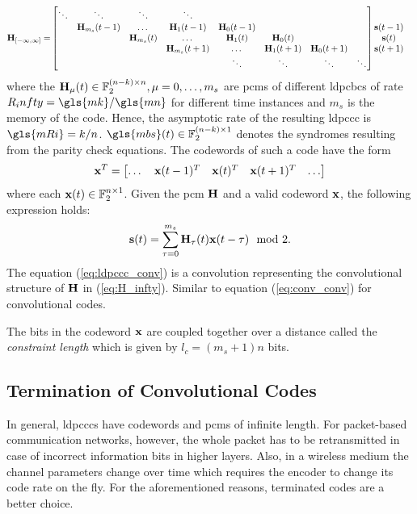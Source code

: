 \begin{align}\label{eq:H_infty}
\mathbf{H}_{[-\infty,\infty]} =& 
\begin{bmatrix}
  \ddots &\ddots &\ddots &\ddots\\
  &\mathbf{H}_{m_s}(t-1) &\dots &\mathbf{H}_1(t-1) &\mathbf{H}_0(t-1)\\
  & &\mathbf{H}_{m_s}(t) &\dots &\mathbf{H}_1(t) &\mathbf{H}_0(t)\\
  & & &\mathbf{H}_{m_s}(t+1) &\dots &\mathbf{H}_1(t+1) &\mathbf{H}_0(t+1)\\
  & & & &\ddots &\ddots &\ddots &\ddots
  \end{bmatrix}
  \begin{matrix}
  \mathbf{s}(t-1)\\
  \mathbf{s}(t)\\
  \mathbf{s}(t+1)\\
  \end{matrix}
\end{align}
where the $\mathbf{H}_\mu(t)\in\mathbb{F}_2^{(n-k)\times n},\mu=0,\dots,m_s$ are \glspl{pcm} of different \glspl{ldpcbc} of rate $R_infty=\gls{mk}/\gls{mn}$ for different time instances and $m_s$ is the memory of the code. Hence, the asymptotic rate of the resulting \gls{ldpccc} is $\gls{mRi}=k/n$. $\gls{mbs}(t)\in\mathbb{F}_2^{(n-k)\times 1}$ denotes the syndromes resulting from the parity check equations. The codewords of such a code have the form 
\begin{align}
\mathbf{x}^T=
\begin{bmatrix}
\dots &\mathbf{x}(t-1)^T &\mathbf{x}(t)^T &\mathbf{x}(t+1)^T &\dots
\end{bmatrix}
\end{align}
where each $\mathbf{x}(t)\in\mathbb{F}_2^{n\times 1}$. Given the \gls{pcm} $\mathbf{H}$ and a valid codeword $\mathbf{x}$, the following expression holds:
\begin{align}\label{eq:ldpccc_conv}
\mathbf{s}(t)=\sum_{\tau=0}^{m_s}\mathbf{H}_\tau(t)\mathbf{x}(t-\tau)\mod 2.
\end{align}
The equation (\ref{eq:ldpccc_conv}) is a convolution representing the convolutional structure of $\mathbf{H}$ in (\ref{eq:H_infty}). Similar to equation (\ref{eq:conv_conv}) for convolutional codes.

The bits in the codeword $\mathbf{x}$ are coupled together over a distance called the \emph{constraint length} which is given by $l_c=(m_s+1)n$ bits.

\subsection{Termination of Convolutional Codes}
In general, \glspl{ldpccc} have codewords and \glspl{pcm} of infinite length. For packet-based communication networks, however, the whole packet has to be retransmitted in case of incorrect information bits in higher layers. Also, in a wireless medium the channel parameters change over time which requires the encoder to change its code rate on the fly. For the aforementioned reasons, terminated codes are a better choice.

